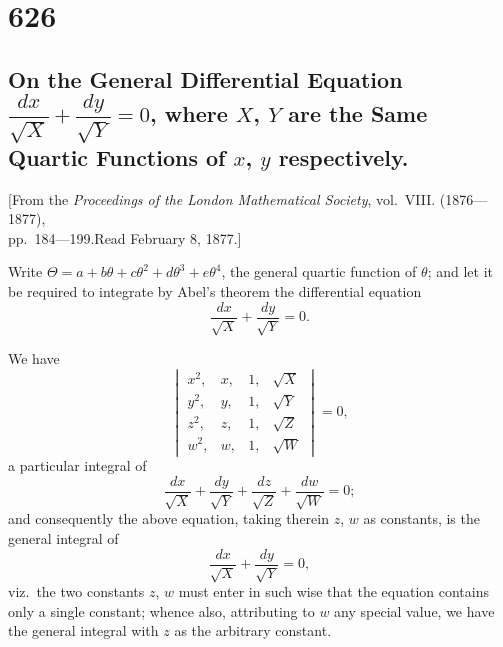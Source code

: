 \documentclass[12pt,a4paper]{article}
\begin{document}
\newpage

\section*{626}
\subsection*{On the General Differential Equation $\dfrac{dx}{\sqrt{X}} + \dfrac{dy}{\sqrt{Y}} = 0$, where $X$, $Y$ are the Same Quartic Functions of $x$, $y$ respectively.}

\begin{center}
\small
[From the \textit{Proceedings of the London Mathematical Society}, vol.~VIII. (1876---1877),\\
pp.~184---199.\quad Read February 8, 1877.]
\end{center}

\medskip
\noindent
Write $\Theta = a + b\theta + c\theta^2 + d\theta^3 + e\theta^4$, the general quartic function of $\theta$; and let it be required to integrate by Abel's theorem the differential equation
\[
\frac{dx}{\sqrt{X}} + \frac{dy}{\sqrt{Y}} = 0.
\]

We have
\[
\begin{vmatrix}
x^2, & x, & 1, & \surd X \\
y^2, & y, & 1, & \surd Y \\
z^2, & z, & 1, & \surd Z \\
w^2, & w, & 1, & \surd W
\end{vmatrix} = 0,
\]
a particular integral of
\[
\frac{dx}{\sqrt{X}} + \frac{dy}{\sqrt{Y}} + \frac{dz}{\sqrt{Z}} + \frac{dw}{\sqrt{W}} = 0;
\]
and consequently the above equation, taking therein $z$, $w$ as constants, is the general integral of
\[
\frac{dx}{\sqrt{X}} + \frac{dy}{\sqrt{Y}} = 0,
\]
viz.\ the two constants $z$, $w$ must enter in such wise that the equation contains only a single constant; whence also, attributing to $w$ any special value, we have the general integral with $z$ as the arbitrary constant.

\newpage
\end{document}
